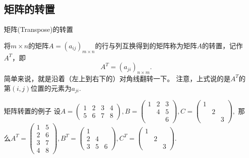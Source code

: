 
\subsection{矩阵的转置}


\begin{frame}{矩阵(Transpose)的转置}

将$m\times n$的矩阵$A = (a_{ij})_{m\times n}$的行与列互换得到的矩阵称为矩阵$A$的转置，记作$A^T$，即
$$A^T = (a_{ji})_{n\times m}.$$
简单来说，就是沿着（左上到右下的）对角线翻转一下。{\color{red} 注意}，上式说的是$A^T$的第$(i,j)$位置的元素为$a_{ji}$.

\pause

\begin{block}{矩阵转置的例子}
设\(\displaystyle A = \begin{pmatrix}
1 & 2 & 3 & 4 \\ 5 & 6 & 7 & 8 \end{pmatrix}, B = \begin{pmatrix}
1 & 2 & 3 \\ & 4 & 5 \\ & & 6 \end{pmatrix}, C = \begin{pmatrix}
1 & & \\ & 2 & \\ & & 3 \end{pmatrix},\) \newline \pause
那么\(\displaystyle A^T = \begin{pmatrix}
1 & 5 \\ 2 & 6 \\ 3 & 7 \\ 4 & 8 \end{pmatrix}, B^T = \begin{pmatrix}
1 & & \\ 2 & 4 & \\ 3 & 5 & 6 \end{pmatrix}, C^T = \begin{pmatrix}
1 & & \\ & 2 & \\ & & 3 \end{pmatrix}.\)
\end{block}

\end{frame}


